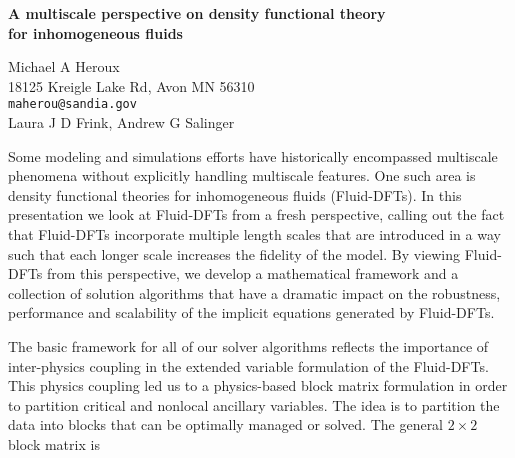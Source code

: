 \documentclass{report}
\begin{document}

\begin{center}
{\large
{\bf A multiscale perspective on density functional theory \\
for inhomogeneous fluids}}

	Michael A Heroux \\
	18125 Kreigle Lake Rd,  Avon MN 56310 \\
	{\tt maherou@sandia.gov} \\
	Laura J D Frink, Andrew G Salinger
\end{center}
Some modeling and simulations efforts have historically
encompassed multiscale phenomena without explicitly handling
multiscale features. One such area is density functional
theories for inhomogeneous fluids (Fluid-DFTs). In this
presentation we look at Fluid-DFTs from a fresh perspective,
calling out the fact that Fluid-DFTs incorporate multiple
length scales that are introduced in a way such that each
longer scale increases the fidelity of the model. By viewing
Fluid-DFTs from this perspective, we develop a mathematical
framework and a collection of solution algorithms that have
a dramatic impact on the robustness, performance and
scalability of the implicit equations generated by
Fluid-DFTs.

The basic
framework for all of our solver algorithms reflects the
importance of inter-physics coupling in the extended
variable formulation of the
Fluid-DFTs.
This physics coupling led
us to a physics-based block matrix formulation in order to
partition critical and nonlocal ancillary variables. The
idea is to partition the data into blocks that can be
optimally managed or solved. The general $2\times 2$ block
matrix is
\end{document}
